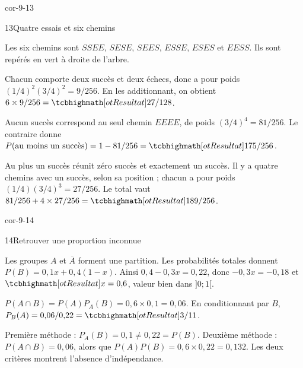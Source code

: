 \begin{blocLivre}{cor-9-13}
\begin{corrige}{13}{Quatre essais et six chemins}
\begin{questions}
\item Les six chemins sont $SSEE$, $SESE$, $SEES$, $ESSE$, $ESES$ et $EESS$.
Ils sont repérés en vert à droite de l’arbre.
\item Chacun comporte deux succès et deux échecs, donc a pour poids
$(1/4)^2(3/4)^2=9/256$.
En les additionnant, on obtient $6\times9/256=\res{27/128}$.
\item Aucun succès correspond au seul chemin $EEEE$, de poids $(3/4)^4=81/256$.
Le contraire donne $P(\text{au moins un succès})=1-81/256=\res{175/256}$.
\item Au plus un succès réunit zéro succès et exactement un succès.
Il y a quatre chemins avec un succès, selon sa position ; chacun a pour poids
$(1/4)(3/4)^3=27/256$.
Le total vaut $81/256+4\times27/256=\res{189/256}$.
\end{questions}

\label{figlivre-r09-13-cor}

\end{corrige}
\end{blocLivre}
\begin{blocLivre}{cor-9-14}
\begin{corrige}{14}{Retrouver une proportion inconnue}
\begin{questions}
\item Les groupes $A$ et $\overline A$ forment une partition.
Les probabilités totales donnent $P(B)=0{,}1x+0{,}4(1-x)$.
Ainsi $0{,}4-0{,}3x=0{,}22$, donc $-0{,}3x=-0{,}18$ et $\res{x=0{,}6}$,
valeur bien dans $]0;1[$.
\item $P(A\cap B)=P(A)P_A(B)=0{,}6\times0{,}1=0{,}06$.
En conditionnant par $B$, $P_B(A)=0{,}06/0{,}22=\res{3/11}$.
\item Première méthode : $P_A(B)=0{,}1\neq0{,}22=P(B)$.
Deuxième méthode : $P(A\cap B)=0{,}06$, alors que $P(A)P(B)=0{,}6\times0{,}22=0{,}132$.
Les deux critères montrent l’absence d’indépendance.
\end{questions}

\label{figlivre-r09-14-cor}

\end{corrige}
\end{blocLivre}
